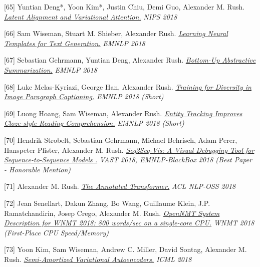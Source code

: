 \documentclass[10pt]{article}
\begin{document}
\medskip


[65] \ind Yuntian Deng*, Yoon Kim*, Justin Chiu, Demi Guo, Alexander M. Rush. \emph{\href{ https://arxiv.org/pdf/1807.03756.pdf }{ Latent Alignment and Variational Attention.} }\emph{ NIPS 2018 }

\medskip


[66] \ind Sam Wiseman, Stuart M. Shieber, Alexander Rush. \emph{\href{ https://arxiv.org/abs/1808.10122 }{ Learning Neural Templates for Text Generation.} }\emph{ EMNLP 2018 }

\medskip


[67] \ind Sebastian Gehrmann, Yuntian Deng, Alexander Rush. \emph{\href{ https://arxiv.org/abs/1808.10792 }{ Bottom-Up Abstractive Summarization.} }\emph{ EMNLP 2018 }

\medskip


[68] \ind Luke Melas-Kyriazi, George Han, Alexander Rush. \emph{\href{ https://www.aclweb.org/anthology/D18-1084 }{ Training for Diversity in Image Paragraph Captioning.} }\emph{ EMNLP 2018 (Short) }

\medskip


[69] \ind Luong Hoang, Sam Wiseman, Alexander Rush. \emph{\href{ https://www.aclweb.org/anthology/D18-1130 }{ Entity Tracking Improves Cloze-style Reading Comprehension.} }\emph{ EMNLP 2018 (Short) }

\medskip


[70] \ind Hendrik Strobelt, Sebastian Gehrmann, Michael Behrisch, Adam Perer, Hanspeter Pfister, Alexander M. Rush. \emph{\href{ https://arxiv.org/abs/1804.09299 }{ Seq2Seq-Vis: A Visual Debugging Tool for Sequence-to-Sequence Models .} }\emph{ VAST 2018, EMNLP-BlackBox 2018 (Best Paper - Honorable Mention) }

\medskip


[71] \ind Alexander M. Rush. \emph{\href{ http://aclweb.org/anthology/W18-2509 }{ The Annotated Transformer.} }\emph{ ACL NLP-OSS 2018 }

\medskip


[72] \ind Jean Senellart, Dakun Zhang, Bo Wang, Guillaume Klein, J.P. Ramatchandirin, Josep Crego, Alexander M. Rush. \emph{\href{ http://aclweb.org/anthology/W18-2715 }{ OpenNMT System Description for WNMT 2018: 800 words/sec on a single-core CPU.} }\emph{ WNMT 2018  (First-Place CPU Speed/Memory) }

\medskip


[73] \ind Yoon Kim, Sam Wiseman, Andrew C. Miller, David Sontag, Alexander M. Rush. \emph{\href{ https://arxiv.org/abs/1802.02550 }{ Semi-Amortized Variational Autoencoders.} }\emph{ ICML 2018 }
\end{document}
